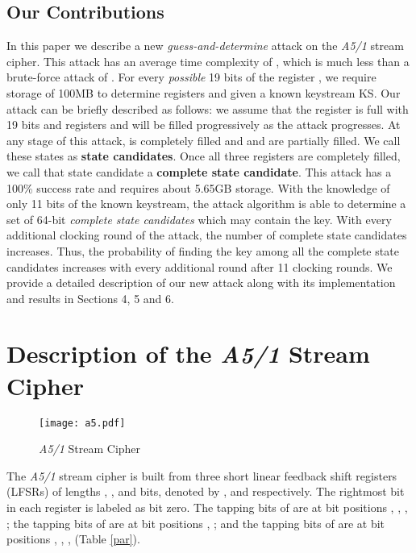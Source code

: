 \documentclass{llncs}
\begin{document}
\subsection{Our Contributions}
In this paper we describe a new \emph{guess-and-determine} attack on the \emph {A5/1} stream cipher. This attack has an average time complexity of , which is much less than a brute-force attack of . For every \emph{possible} 19 bits of the register , we require storage of 100MB to determine registers  and  given a known keystream KS. Our attack can be briefly described as follows: we assume that the register  is full with 19 bits and registers  and  will be filled progressively as the attack progresses. At any stage of this attack,  is completely filled and  and  are partially filled. We call these states as \textbf{state candidates}. Once all three registers are completely filled, we call that state candidate a \textbf{complete state candidate}. 
This attack has a 100\% success rate and requires about 5.65GB storage. With the knowledge of only 11 bits of the known keystream, the attack algorithm is able to determine a set of 64-bit \emph{complete state candidates} which may contain the key. With every additional clocking round of the attack, the number of complete state candidates increases. Thus, the probability of finding the key among all the complete state candidates increases with every additional round after 11 clocking rounds. We provide a detailed description of our new attack along with its implementation and results in Sections 4, 5 and 6.

\section{Description of the \emph {A5/1} Stream Cipher}
\begin{figure}[!htb]
\begin{center}
\hspace*{-1cm}
\texttt{[image: a5.pdf]}
\caption{\emph{A5/1} Stream Cipher}
\label{a}
\end{center}
\end{figure}
The \emph {A5/1} stream cipher is built from three short linear feedback
shift registers (LFSRs) of lengths , , and  bits, denoted by ,  and  respectively. The rightmost bit in each register is labeled as bit zero. The tapping bits of  are at bit positions , , , ; the tapping bits of  are at bit positions , ; and the tapping bits of  are at bit positions , , ,  (Table \ref{par}). 
\end{document}

